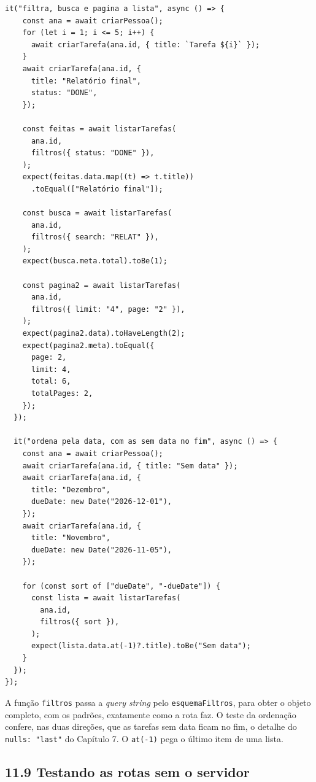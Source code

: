 \begin{codigo}
\begin{Verbatim}[breaklines=true, breaksymbolleft={}, fontsize=\footnotesize]
  it("filtra, busca e pagina a lista", async () => {
    const ana = await criarPessoa();
    for (let i = 1; i <= 5; i++) {
      await criarTarefa(ana.id, { title: `Tarefa ${i}` });
    }
    await criarTarefa(ana.id, {
      title: "Relatório final",
      status: "DONE",
    });

    const feitas = await listarTarefas(
      ana.id,
      filtros({ status: "DONE" }),
    );
    expect(feitas.data.map((t) => t.title))
      .toEqual(["Relatório final"]);

    const busca = await listarTarefas(
      ana.id,
      filtros({ search: "RELAT" }),
    );
    expect(busca.meta.total).toBe(1);

    const pagina2 = await listarTarefas(
      ana.id,
      filtros({ limit: "4", page: "2" }),
    );
    expect(pagina2.data).toHaveLength(2);
    expect(pagina2.meta).toEqual({
      page: 2,
      limit: 4,
      total: 6,
      totalPages: 2,
    });
  });

  it("ordena pela data, com as sem data no fim", async () => {
    const ana = await criarPessoa();
    await criarTarefa(ana.id, { title: "Sem data" });
    await criarTarefa(ana.id, {
      title: "Dezembro",
      dueDate: new Date("2026-12-01"),
    });
    await criarTarefa(ana.id, {
      title: "Novembro",
      dueDate: new Date("2026-11-05"),
    });

    for (const sort of ["dueDate", "-dueDate"]) {
      const lista = await listarTarefas(
        ana.id,
        filtros({ sort }),
      );
      expect(lista.data.at(-1)?.title).toBe("Sem data");
    }
  });
});
\end{Verbatim}
\end{codigo}

A função \texttt{filtros} passa a \textit{query string} pelo \texttt{esquemaFiltros}, para obter o objeto completo, com os padrões, exatamente como a rota faz. O teste da ordenação confere, nas duas direções, que as tarefas sem data ficam no fim, o detalhe do \texttt{nulls: "last"} do Capítulo 7. O \texttt{at(-1)} pega o último item de uma lista.

\subsection{11.9 Testando as rotas sem o servidor}


